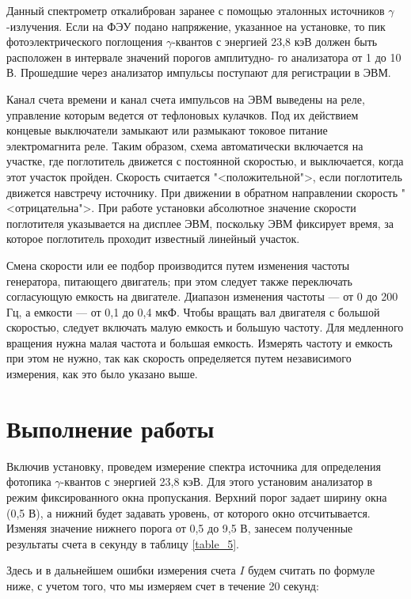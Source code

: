 \documentclass[12pt]{kiarticle} %
\begin{document}
	Данный спектрометр откалиброван заранее с помощью эталонных
	источников $ \gamma $-излучения. Если на ФЭУ подано напряжение, указанное на установке, то пик фотоэлектрического поглощения $ \gamma $-квантов с энергией 23,8 кэВ
	должен быть расположен в интервале значений порогов амплитудно-
	го анализатора от 1 до 10 В. Прошедшие через анализатор импульсы
	поступают для регистрации в ЭВМ.
	
	Канал счета времени и канал счета импульсов на ЭВМ выведены
	на реле, управление которым ведется от тефлоновых кулачков. Под их
	действием концевые выключатели замыкают или размыкают токовое
	питание электромагнита реле. Таким образом, схема автоматически
	включается на участке, где поглотитель движется с постоянной скоростью, и выключается, когда этот участок пройден. Скорость считается "<положительной">, если поглотитель движется навстречу источнику.
	При движении в обратном направлении скорость "<отрицательна">. При
	работе установки абсолютное значение скорости поглотителя указывается на дисплее ЭВМ, поскольку ЭВМ фиксирует время, за которое
	поглотитель проходит известный линейный участок.
	
	Смена скорости или ее подбор производится путем изменения частоты генератора, питающего двигатель; при этом следует также переключать согласующую емкость на двигателе. Диапазон изменения
	частоты --- от 0 до 200 Гц, а емкости --- от 0,1 до 0,4 мкФ. Чтобы вращать вал двигателя с большой скоростью, следует включать малую
	емкость и большую частоту. Для медленного вращения нужна малая
	частота и большая емкость. Измерять частоту и емкость при этом не нужно, так как скорость определяется путем независимого измерения,
	как это было указано выше.

	
	\section{Выполнение работы}
	
	Включив установку, проведем измерение спектра источника для определения фотопика $ \gamma $-квантов с энергией 23,8 кэВ. Для этого установим анализатор в режим фиксированного окна пропускания. Верхний порог задает ширину окна (0,5 В), а нижний будет задавать уровень, от которого окно отсчитывается. Изменяя значение нижнего порога от 0,5 до 9,5 В, занесем полученные результаты счета в секунду в таблицу \ref{table_5}. 
	
	Здесь и в дальнейшем ошибки измерения счета $ I $ будем считать по формуле ниже, с учетом того, что мы измеряем счет в течение 20 секунд:
	
\end{document}
